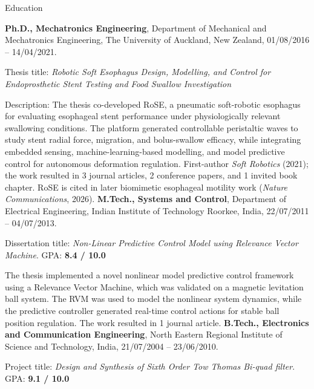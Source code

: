\begin{rubric}{Education}

\entry*[2016 -- 2021]%
	\textbf{Ph.D., Mechatronics Engineering}, Department of Mechanical and Mechatronics Engineering, The University of Auckland, New Zealand, 01/08/2016 -- 14/04/2021.
	\par\smallskip Thesis title: \emph{Robotic Soft Esophagus Design, Modelling, and Control for Endoprosthetic Stent Testing and Food Swallow Investigation}
	\par\smallskip
	Description: The thesis co-developed RoSE, a pneumatic soft-robotic esophagus for evaluating esophageal stent performance under physiologically relevant swallowing conditions. The platform generated controllable peristaltic waves to study stent radial force, migration, and bolus-swallow efficacy, while integrating embedded sensing, machine-learning-based modelling, and model predictive control for autonomous deformation regulation. First-author \textit{Soft Robotics} (2021); the work resulted in 3 journal articles, 2 conference papers, and 1 invited book chapter. RoSE is cited in later biomimetic esophageal motility work (\textit{Nature Communications}, 2026).
%
\entry*[2011 -- 2013]%
	\textbf{M.Tech., Systems and Control}, Department of Electrical Engineering, Indian Institute of Technology Roorkee, India, 22/07/2011 -- 04/07/2013.\par\smallskip
	Dissertation title: \emph{Non-Linear Predictive Control Model using Relevance Vector Machine}.
	GPA: \textbf{8.4 / 10.0}
    \par\smallskip
    The thesis implemented a novel nonlinear model predictive control framework using a Relevance Vector Machine, which was validated on a magnetic levitation ball system. The RVM was used to model the nonlinear system dynamics, while the predictive controller generated real-time control actions for stable ball position regulation. The work resulted in 1 journal article.
%	
\entry*[2004 -- 2010]%
	\textbf{B.Tech., Electronics and Communication Engineering}, North Eastern Regional Institute of Science and Technology, India, 21/07/2004 -- 23/06/2010.\par\smallskip
	Project title: \emph{Design and Synthesis of Sixth Order Tow Thomas Bi-quad filter}.
	GPA: \textbf{9.1 / 10.0}
    
    
\end{rubric}

